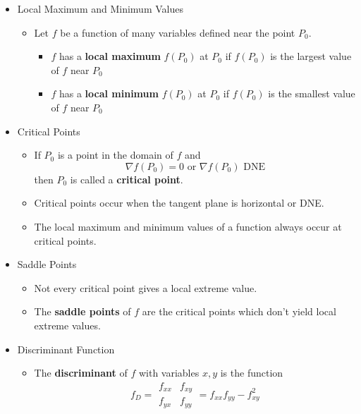 \begin{itemize}

  \item Local Maximum and Minimum Values
  
    \begin{itemize}
    \item Let $f$ be a function of many variables defined near the point $P_0$.
      \begin{itemize}
      \item $f$ has a \textbf{local maximum} $f(P_0)$ at $P_0$ if $f(P_0)$ is the largest value of $f$ near $P_0$
      \item $f$ has a \textbf{local minimum} $f(P_0)$ at $P_0$ if $f(P_0)$ is the smallest value of $f$ near $P_0$
      \end{itemize}
    \end{itemize}

  \item Critical Points
    \begin{itemize}
      \item
        If $P_0$ is a point in the domain of $f$ and
          \[
            \nabla f(P_0) = 0 \text{ or } \nabla f(P_0) \text{ DNE}
          \]
        then $P_0$ is called a \textbf{critical point}.
      \item
        Critical points occur when the tangent plane is horizontal or DNE.
      \item
        The local maximum and minimum values of a function always occur at critical points.
    \end{itemize}
    
  \item Saddle Points
  
    \begin{itemize}
      \item 
        Not every critical point gives a local extreme value.
      \item 
        The \textbf{saddle points} of $f$ are the critical points which don't yield local extreme values.
    \end{itemize}
    
  \item Discriminant Function
    \begin{itemize}
      \item The \textbf{discriminant} of $f$ with variables $x,y$ is the function
        \[
          f_D = \begin{array}{|cc|}f_{xx}&f_{xy}\\f_{yx}&f_{yy}\end{array} = f_{xx}f_{yy} - f_{xy}^2
        \]
    \end{itemize}


\end{itemize}
